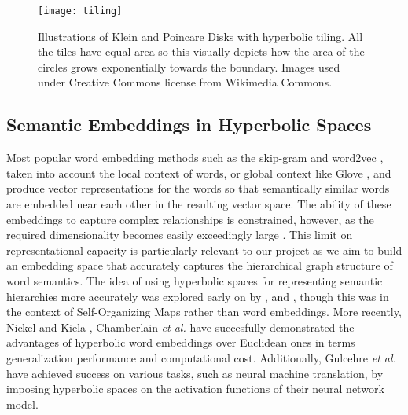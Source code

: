\documentclass[12pt]{report}
\begin{document}
\begin{figure}
  \centering
	\texttt{[image: tiling]}
	\caption{Illustrations of Klein and Poincare Disks with hyperbolic tiling. All the tiles have equal area so this visually depicts how the area of the circles grows exponentially towards the boundary. Images used under Creative Commons license from Wikimedia Commons.}
	\label{fig:hyspace}
\end{figure}

\subsection{Semantic Embeddings in Hyperbolic Spaces} \label{sec:poincare}
Most popular word embedding methods such as the skip-gram and word2vec \cite{Mikolov2013}, \cite{Mikolov} taken into account the local context of words, or global context like Glove \cite{Pennington2014}, and produce vector representations for the words so that semantically similar words are embedded near each other in the resulting vector space. The ability of these embeddings to capture complex relationships is constrained, however, as the required dimensionality becomes easily exceedingly large \cite{Nickel2017} \cite{Chamberlain2017} \cite{Nickel2018}. This limit on representational capacity is particularly relevant to our project as we aim to build an embedding space that accurately captures the hierarchical graph structure of word semantics. The idea of using hyperbolic spaces for representing semantic hierarchies more accurately was explored early on by \cite{Ritter1999}, \cite{Ontrup2002} and \cite{Walter2006}, though this was in the context of Self-Organizing Maps rather than word embeddings. More recently, Nickel and Kiela \cite{Nickel2017}, Chamberlain \textit{et al.} \cite{Chamberlain2017} have succesfully demonstrated the advantages of hyperbolic word embeddings over Euclidean ones in terms generalization performance and computational cost. Additionally, Gulcehre \textit{et al.} \cite{Gulcehre2018} have achieved success on various tasks, such as neural machine translation, by imposing hyperbolic spaces on the activation functions of their neural network model.
\end{document}
